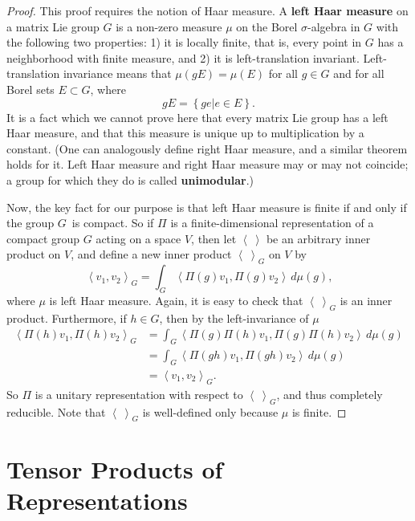 \documentclass{amsbook}
\theoremstyle{plain}
\numberwithin{equation}{chapter}
\numberwithin{theorem}{chapter}
\begin{document}
\begin{proof}
This proof requires the notion of Haar measure. A \textbf{left Haar measure}
on a matrix Lie group $G$ is a non-zero measure $\mu$ on the Borel $\sigma
$-algebra in $G$ with the following two properties: 1) it is locally finite,
that is, every point in $G$ has a neighborhood with finite measure, and 2) it
is left-translation invariant. Left-translation invariance means that
$\mu\left(  gE\right)  =\mu\left(  E\right)  $ for all $g\in G$ and for all
Borel sets $E\subset G$, where
\[
gE=\left\{  ge\left|  e\in E\right.  \right\}  \text{.}%
\]
It is a fact which we cannot prove here that every matrix Lie group has a left
Haar measure, and that this measure is unique up to multiplication by a
constant. (One can analogously define right Haar measure, and a similar
theorem holds for it. Left Haar measure and right Haar measure may or may not
coincide; a group for which they do is called \textbf{unimodular}.)

Now, the key fact for our purpose is that left Haar measure is finite if and
only if the group $G\,$ is compact. So if $\Pi$ is a finite-dimensional
representation of a compact group $G$ acting on a space $V$, then let
$\left\langle \ \right\rangle $ be an arbitrary inner product on $V$, and
define a new inner product $\left\langle \ \right\rangle _{G}$ on $V$ by
\[
\left\langle v_{1},v_{2}\right\rangle _{G}=\int_{G}\left\langle \Pi
(g)v_{1},\Pi(g)v_{2}\right\rangle \,d\mu\left(  g\right)  \text{,}%
\]
where $\mu$ is left Haar measure. Again, it is easy to check that
$\left\langle \ \right\rangle _{G}$ is an inner product. Furthermore, if $h\in
G$, then by the left-invariance of $\mu$
\begin{align*}
\left\langle \Pi(h)v_{1},\Pi(h)v_{2}\right\rangle _{G}  & =\int_{G}%
\left\langle \Pi(g)\Pi(h)v_{1},\Pi(g)\Pi(h)v_{2}\right\rangle \,d\mu\left(
g\right)  \\
& =\int_{G}\left\langle \Pi(gh)v_{1},\Pi(gh)v_{2}\right\rangle \,d\mu\left(
g\right)  \\
& =\left\langle v_{1},v_{2}\right\rangle _{G}\text{.}%
\end{align*}
So $\Pi$ is a unitary representation with respect to $\left\langle
\ \right\rangle _{G}$, and thus completely reducible. Note that $\left\langle
\ \right\rangle _{G}$ is well-defined only because $\mu$ is finite.
\end{proof}

\section{Tensor Products of Representations}
\end{document}
